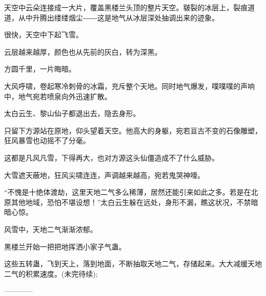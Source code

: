 \begin{this_body}
天空中云朵连接成一大片，覆盖黑楼兰头顶的整片天空。皲裂的冰层上，裂痕道道，从中升腾出缕缕烟尘――这是地气从冰层深处抽调出来的迹象。

很快，天空中下起飞雪。

云层越来越厚，颜色也从先前的灰白，转为深黑。

方圆千里，一片晦暗。

大风呼啸，卷起寒冷刺骨的冰霜，充斥整个天地。同时地气爆发，噗噗噗的声响中，地气宛若喷泉向外迅速扩散。

太白云生、黎山仙子都退出去，隐去身形。

只留下方源站在原地，仰头望着天空。他高大的身躯，宛若亘古不变的石像雕塑，狂风暴雪也动摇不了分毫。

这都是凡风凡雪，下得再大，也对方源这头仙僵造成不了什么威胁。

大雪遮天蔽地，狂风尖啸连连，声调越来越高，宛若鬼哭神嚎。

“不愧是十绝体渡劫，这里天地二气多么稀薄，居然还能引来如此之多。若是在北原其他地域，恐怕不堪设想！”太白云生躲在远处，身形不漏，瞧这状况，不禁暗暗心惊。

风雪中，天地二气渐渐浓郁。

黑楼兰开始一把把地挥洒小家子气蛊。

这些五转蛊，飞到天上，落到地面，不断抽取天地二气，存储起来。大大减缓天地二气的积累速度。(未完待续);

------------

\end{this_body}

